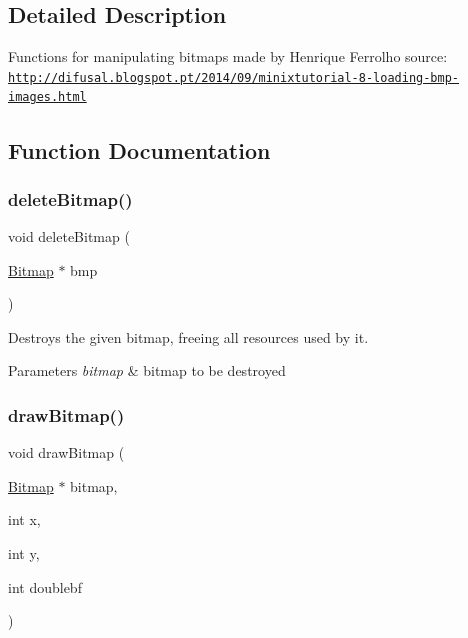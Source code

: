 \subsection{Detailed Description}
Functions for manipulating bitmaps made by Henrique Ferrolho source\+: \href{http://difusal.blogspot.pt/2014/09/minixtutorial-8-loading-bmp-images.html}{\tt http\+://difusal.\+blogspot.\+pt/2014/09/minixtutorial-\/8-\/loading-\/bmp-\/images.\+html} 

\subsection{Function Documentation}
\hypertarget{group___bitmap_ga08c1d4f4fff81df260d979ea8fc1aa61}{}\label{group___bitmap_ga08c1d4f4fff81df260d979ea8fc1aa61} 
\subsubsection{\texorpdfstring{delete\+Bitmap()}{deleteBitmap()}}
{\footnotesize\ttfamily void delete\+Bitmap (\begin{DoxyParamCaption}\item[{\hyperlink{struct_bitmap}{Bitmap} $\ast$}]{bmp }\end{DoxyParamCaption})}



Destroys the given bitmap, freeing all resources used by it. 


\begin{DoxyParams}{Parameters}
{\em bitmap} & bitmap to be destroyed \\
\hline
\end{DoxyParams}
\hypertarget{group___bitmap_gafe3e5be36ca808fa1383387b7943aa10}{}\label{group___bitmap_gafe3e5be36ca808fa1383387b7943aa10} 
\subsubsection{\texorpdfstring{draw\+Bitmap()}{drawBitmap()}}
{\footnotesize\ttfamily void draw\+Bitmap (\begin{DoxyParamCaption}\item[{\hyperlink{struct_bitmap}{Bitmap} $\ast$}]{bitmap,  }\item[{int}]{x,  }\item[{int}]{y,  }\item[{int}]{doublebf }\end{DoxyParamCaption})}



